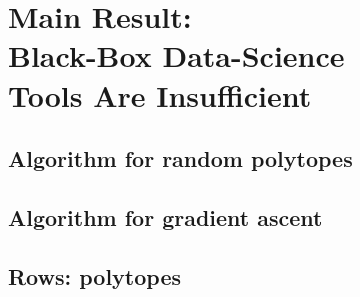 
\section[Main Result: Data-Science Search]{Main Result:\\Black-Box Data-Science\\Tools Are Insufficient}\label{sec:black-box-datascience}
%
%
%
\subsection{Algorithm for random polytopes}\label{subsec:black-box-datascience-algorithm-for-random-polytopes}
%
%
\subsection{Algorithm for gradient ascent}\label{subsec:black-box-datascience-algorithm-for-gradient-ascent}
%
%
\subsection{Rows: polytopes}\label{subsec:black-box-datascience-rows-polytopes}
%
%
